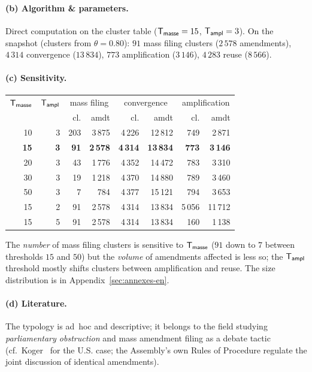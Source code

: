 \paragraph{(b) Algorithm \& parameters.} Direct computation on the cluster table
($\mathsf{T_{masse}}=15$, $\mathsf{T_{ampl}}=3$). On the snapshot (clusters from
$\theta=0.80$): $91$ \og{}mass filing\fg{} clusters ($2\,578$ amendments),
$4\,314$ \og{}convergence\fg{} ($13\,834$), $773$ \og{}amplification\fg{}
($3\,146$), $4\,283$ \og{}reuse\fg{} ($8\,566$).

\paragraph{(c) Sensitivity.}
\begin{center}\small
\begin{tabular}{rr rr rr rr}
\toprule
$\mathsf{T_{masse}}$ & $\mathsf{T_{ampl}}$ & \multicolumn{2}{c}{mass filing} & \multicolumn{2}{c}{convergence} & \multicolumn{2}{c}{amplification} \\
 & & cl. & amdt & cl. & amdt & cl. & amdt \\
\midrule
10 & 3 & 203 & 3\,875 & 4\,226 & 12\,812 & 749 & 2\,871 \\
\textbf{15} & \textbf{3} & \textbf{91} & \textbf{2\,578} & \textbf{4\,314} & \textbf{13\,834} & \textbf{773} & \textbf{3\,146} \\
20 & 3 & 43 & 1\,776 & 4\,352 & 14\,472 & 783 & 3\,310 \\
30 & 3 & 19 & 1\,218 & 4\,370 & 14\,880 & 789 & 3\,460 \\
50 & 3 & \phantom{0}7 & \phantom{0,}784 & 4\,377 & 15\,121 & 794 & 3\,653 \\
\midrule
15 & 2 & 91 & 2\,578 & 4\,314 & 13\,834 & 5\,056 & 11\,712 \\
15 & 5 & 91 & 2\,578 & 4\,314 & 13\,834 & 160 & 1\,138 \\
\bottomrule
\end{tabular}
\end{center}
The \emph{number} of \og{}mass filing\fg{} clusters is sensitive to
$\mathsf{T_{masse}}$ ($91$ down to $7$ between thresholds $15$ and $50$) but the
\emph{volume} of amendments affected is less so; the $\mathsf{T_{ampl}}$ threshold
mostly shifts clusters between \og{}amplification\fg{} and \og{}reuse\fg{}. The
size distribution is in Appendix~\ref{sec:annexes-en}.

\paragraph{(d) Literature.} The typology is ad~hoc and descriptive; it belongs to
the field studying \emph{parliamentary obstruction} and mass amendment filing as a
debate tactic (cf.~Koger~\cite{koger2010} for the U.S. case; the Assembly's own
Rules of Procedure regulate the \og{}joint discussion\fg{} of identical
amendments).

